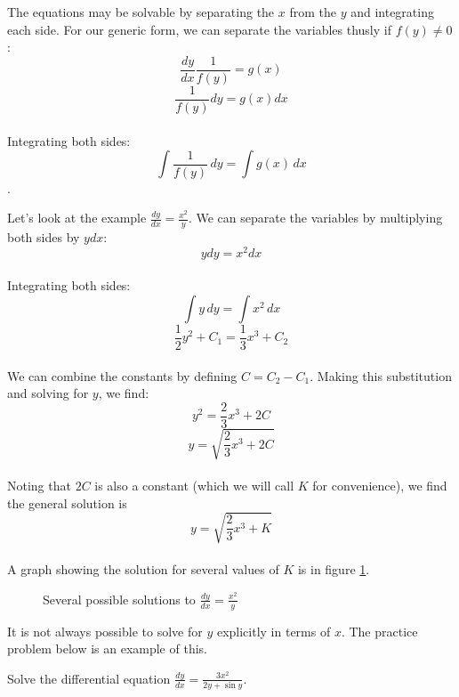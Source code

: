 The equations may be solvable by separating the $x$ from the $y$ and 
integrating each side. For our generic form, we can separate the 
variables thusly if $f(y) \neq 0$: 
$$\frac{dy}{dx}\frac{1}{f(y)} = g(x)$$ 
$$\frac{1}{f(y)}dy = g(x) dx$$ \\
Integrating both sides: $$\int \frac{1}{f(y)}\,dy = \int g(x)\,dx$$.

Let's look at the example $\frac{dy}{dx} = \frac{x^2}{y}$. We can 
separate the variables by multiplying both sides by $y dx$: 
$$y dy = x^2 dx$$\\
Integrating both sides: 
$$\int y\,dy = \int x^2\,dx$$
$$\frac{1}{2}y^2 + C_1 = \frac{1}{3}x^3 + C_2$$ \\
We can combine the constants by defining $C = C_2 - C_1$. Making this 
substitution and solving for $y$, we find: 
$$y^2 = \frac{2}{3} x^3 + 2C$$ 
$$y = \sqrt{\frac{2}{3} x^3 + 2C}$$\\
Noting that $2C$ is also a constant (which we will call $K$ for 
convenience), we find the general solution is 
$$y = \sqrt{\frac{2}{3} x^3 + K}$$ \\
A graph showing the solution for several values of $K$ is in figure 
\ref{fig:solutions}.

\begin{figure}[htbp]
\centering
    \caption{Several possible solutions to $\frac{dy}{dx} = 
    \frac{x^2}{y}$}
    \label{fig:solutions}
\end{figure}

It is not always possible to solve for $y$ explicitly in terms of 
$x$. The practice problem below is an example of this. 

\begin{Exercise}[label = diffeq1]
	Solve the differential equation $\frac{dy}{dx} = \frac{3x^2}{2y + \sin{y}}$. 
	\vspace{50mm}
\end{Exercise}

